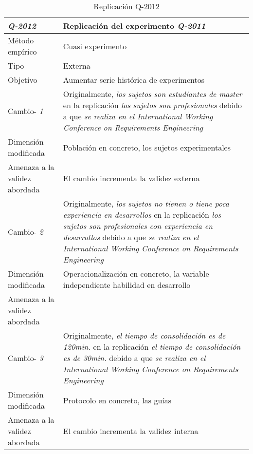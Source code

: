 
\begin{table}
\caption{Replicación Q-2012}
\begin{tabular}{| p{3.3cm} | p{9cm} |}
\hline

\textbf {\textit{Q-2012}} & Replicación del experimento \textit{Q-2011 }    \\  \hline

Método empírico &  Cuasi experimento   \\  \hline
Tipo &  Externa   \\  \hline
Objetivo  &   Aumentar serie histórica de experimentos
   \\  \hline \hline

Cambio- \textit{1}   & \parbox[t]{9cm} {Originalmente,  \textit{los sujetos son estudiantes de master} } \parbox[t]{9cm}{en la replicación \textit{ los sujetos son profesionales} }  debido a que \textit{se realiza en el International Working Conference on Requirements Engineering } \\  \hline
Dimensión modificada & 
 Población en concreto, los sujetos experimentales   \\  \hline 
Amenaza a la validez abordada  & El cambio incrementa la validez externa  \\  \hline
 \hline
 
 Cambio- \textit{2}   & \parbox[t]{9cm} {Originalmente,  \textit{los sujetos no tienen o tiene poca experiencia en desarrollos } } \parbox[t]{9cm}{en la replicación \textit{ los sujetos son profesionales con experiencia en desarrollos} }  debido a que \textit{se realiza en el International Working Conference on Requirements Engineering } \\  \hline
Dimensión modificada & 
 Operacionalización en concreto,  la variable independiente habilidad en desarrollo  \\  \hline 
Amenaza a la validez abordada  &   \\  \hline
 \hline

Cambio- \textit{3}   & \parbox[t]{9cm} {Originalmente,  \textit{el tiempo de consolidación es de 120min.} } \parbox[t]{9cm}{en la replicación \textit{el tiempo de consolidación es de 30min. } } debido a que \textit{se realiza en el International Working Conference on Requirements Engineering} \\  \hline
Dimensión modificada & 
 Protocolo en concreto, las guías    \\  \hline 
Amenaza a la validez abordada  & El cambio incrementa la validez  interna  \\  \hline \hline


\end{tabular}
\end{table}
